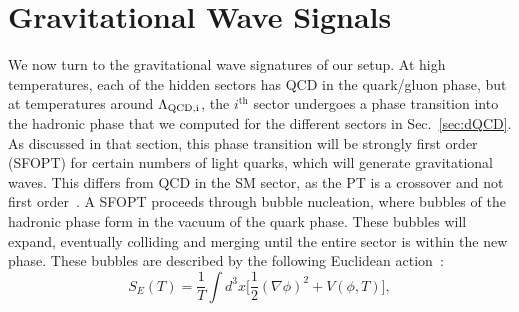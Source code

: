 \documentclass[nofootinbib,twocolumn,preprintnumbers]{revtex4-1}
\begin{document}
\section{Gravitational Wave Signals}
\label{sec:gw}
We now turn to the gravitational wave signatures of our setup. At high temperatures, each of the hidden sectors has QCD in the quark/gluon phase, but at temperatures around $\Lambda_{\rm QCD,i}$, the $i^{\mathrm{th}}$ sector undergoes a phase transition into the hadronic phase that we computed for the different sectors in Sec.~\ref{sec:dQCD}. As discussed in that section, this phase transition will be strongly first order (SFOPT) for certain numbers of light quarks, which will generate gravitational waves. This differs from QCD in the SM sector, as the PT is a crossover and not first order~\cite{Fodor:2001pe}. 
A SFOPT proceeds through bubble nucleation, where bubbles of the hadronic phase form in the vacuum of the quark phase. These bubbles will expand, eventually colliding and merging until the entire sector is within the new phase.  These bubbles are described by the following Euclidean action~\cite{Linde:1981zj}:
%
\begin{equation}\label{eqn:EuclideanAction}
S_{E}(T) = \frac{1}{T}\int d^3x \bigg[\frac{1}{2}(\nabla\phi)^2 + V(\phi,T)  \bigg],
\end{equation}
\end{document}
